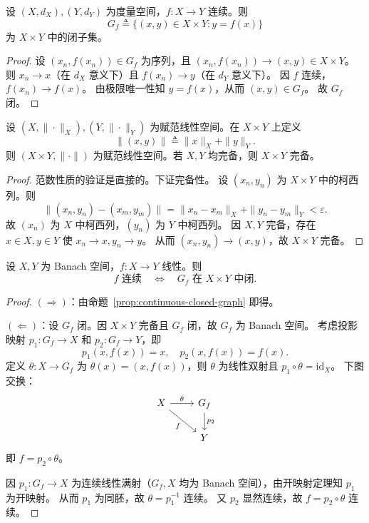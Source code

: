 \documentclass[lang=cn,a4paper,newtx,section]{elegantbook}
\begin{document}
\begin{proposition}\label{prop:continuous-closed-graph}
  设 $(X,d_X),(Y,d_Y)$ 为度量空间，$f:X\to Y$ 连续。则
  \[
    G_f\triangleq\{(x,y)\in X\times Y:y=f(x)\}
  \]
  为 $X\times Y$ 中的闭子集。
\end{proposition}

\begin{proof}
  设 $(x_n,f(x_n))\in G_f$ 为序列，且 $(x_n,f(x_n))\to(x,y)\in X\times Y$。
  则 $x_n\to x$（在 $d_X$ 意义下）且 $f(x_n)\to y$（在 $d_Y$ 意义下）。
  因 $f$ 连续，$f(x_n)\to f(x)$。
  由极限唯一性知 $y=f(x)$，从而 $(x,y)\in G_f$。
  故 $G_f$ 闭。
\end{proof}

\begin{lemma}
  设 $(X,\|\cdot\|_X),(Y,\|\cdot\|_Y)$ 为赋范线性空间。在 $X\times Y$ 上定义
  \[
    \|(x,y)\|\triangleq\|x\|_X+\|y\|_Y.
  \]
  则 $(X\times Y,\|\cdot\|)$ 为赋范线性空间。若 $X,Y$ 均完备，则 $X\times Y$ 完备。
\end{lemma}

\begin{proof}
  范数性质的验证是直接的。下证完备性。
  设 $(x_n,y_n)$ 为 $X\times Y$ 中的柯西列。则
  \[
    \|(x_n,y_n)-(x_m,y_m)\|=\|x_n-x_m\|_X+\|y_n-y_m\|_Y<\varepsilon.
  \]
  故 $(x_n)$ 为 $X$ 中柯西列，$(y_n)$ 为 $Y$ 中柯西列。
  因 $X,Y$ 完备，存在 $x\in X,y\in Y$ 使 $x_n\to x,y_n\to y$。
  从而 $(x_n,y_n)\to(x,y)$，故 $X\times Y$ 完备。
\end{proof}

\begin{theorem}[闭图像定理]\label{thm:closed-graph}
  设 $X,Y$ 为 Banach 空间，$f:X\to Y$ 线性。则
  \[
    f\text{ 连续}\quad\Longleftrightarrow\quad G_f\text{ 在 }X\times Y\text{ 中闭}.
  \]
\end{theorem}

\begin{proof}
  $(\Rightarrow)$：由命题~\ref{prop:continuous-closed-graph} 即得。

  $(\Leftarrow)$：设 $G_f$ 闭。因 $X\times Y$ 完备且 $G_f$ 闭，故 $G_f$ 为 Banach 空间。
  考虑投影映射 $p_1:G_f\to X$ 和 $p_2:G_f\to Y$，即
  \[
    p_1(x,f(x))=x,\quad p_2(x,f(x))=f(x).
  \]
  定义 $\theta:X\to G_f$ 为 $\theta(x)=(x,f(x))$，则 $\theta$ 为线性双射且 $p_1\circ\theta=\mathrm{id}_X$。
  下图交换：
  \[
    \begin{tikzcd}
      X \arrow[r,"\theta"] \arrow[dr,"f"'] & G_f \arrow[d,"p_2"] \\
      & Y
    \end{tikzcd}
  \]
  即 $f=p_2\circ\theta$。

  因 $p_1:G_f\to X$ 为连续线性满射（$G_f,X$ 均为 Banach 空间），由开映射定理知 $p_1$ 为开映射。
  从而 $p_1$ 为同胚，故 $\theta=p_1^{-1}$ 连续。
  又 $p_2$ 显然连续，故 $f=p_2\circ\theta$ 连续。
\end{proof}
\end{document}
